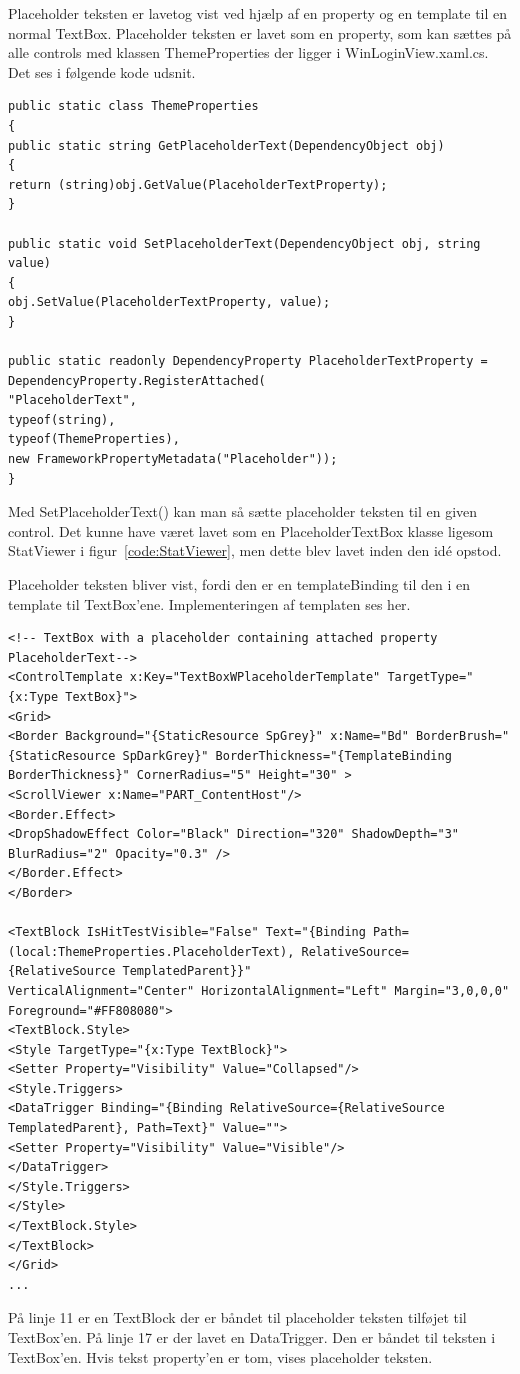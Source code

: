 Placeholder teksten er lavetog vist ved hjælp af en property og en template til en normal TextBox.
Placeholder teksten er lavet som en property, som kan sættes på alle controls med klassen ThemeProperties der ligger i WinLoginView.xaml.cs. Det ses i følgende kode udsnit.
\begin{lstlisting}[caption=ThemeProperties, label=code:ThemeProperties]
public static class ThemeProperties
{
public static string GetPlaceholderText(DependencyObject obj)
{
return (string)obj.GetValue(PlaceholderTextProperty);
}

public static void SetPlaceholderText(DependencyObject obj, string value)
{
obj.SetValue(PlaceholderTextProperty, value);
}

public static readonly DependencyProperty PlaceholderTextProperty =
DependencyProperty.RegisterAttached(
"PlaceholderText",
typeof(string),
typeof(ThemeProperties),
new FrameworkPropertyMetadata("Placeholder"));
}
\end{lstlisting} 
Med SetPlaceholderText() kan man så sætte placeholder teksten til en given control.
Det kunne have været lavet som en PlaceholderTextBox klasse ligesom StatViewer i figur~\ref{code:StatViewer}, men dette blev lavet inden den idé opstod.

Placeholder teksten bliver vist, fordi den er en templateBinding til den i en template til TextBox'ene. Implementeringen af templaten ses her.
\begin{lstlisting}[caption=TextBoxWPlaceholderTemplate, label=code:TextBoxWPlaceholderTemplate]
<!-- TextBox with a placeholder containing attached property PlaceholderText-->
<ControlTemplate x:Key="TextBoxWPlaceholderTemplate" TargetType="{x:Type TextBox}">
<Grid>
<Border Background="{StaticResource SpGrey}" x:Name="Bd" BorderBrush="{StaticResource SpDarkGrey}" BorderThickness="{TemplateBinding BorderThickness}" CornerRadius="5" Height="30" >
<ScrollViewer x:Name="PART_ContentHost"/>
<Border.Effect>
<DropShadowEffect Color="Black" Direction="320" ShadowDepth="3" BlurRadius="2" Opacity="0.3" />
</Border.Effect>
</Border>

<TextBlock IsHitTestVisible="False" Text="{Binding Path=(local:ThemeProperties.PlaceholderText), RelativeSource={RelativeSource TemplatedParent}}" 
VerticalAlignment="Center" HorizontalAlignment="Left" Margin="3,0,0,0" Foreground="#FF808080">
<TextBlock.Style>
<Style TargetType="{x:Type TextBlock}">
<Setter Property="Visibility" Value="Collapsed"/>
<Style.Triggers>
<DataTrigger Binding="{Binding RelativeSource={RelativeSource TemplatedParent}, Path=Text}" Value="">
<Setter Property="Visibility" Value="Visible"/>
</DataTrigger>
</Style.Triggers>
</Style>
</TextBlock.Style>
</TextBlock>
</Grid>
...
\end{lstlisting}
På linje 11 er en TextBlock der er båndet til placeholder teksten tilføjet til TextBox'en. 
På linje 17 er der lavet en DataTrigger. Den er båndet til teksten i TextBox'en. Hvis tekst property'en er tom, vises placeholder teksten.
